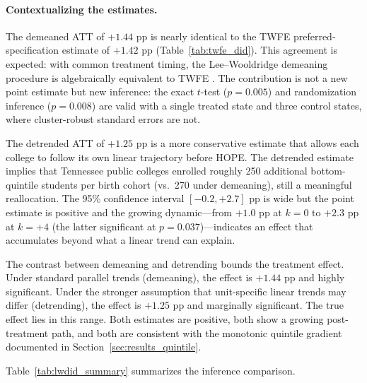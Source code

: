 \paragraph{Contextualizing the estimates.}

The demeaned ATT of $+1.44$ pp is nearly identical to the TWFE
preferred-specification estimate of $+1.42$ pp
(Table~\ref{tab:twfe_did}). This agreement is expected: with common
treatment timing, the Lee--Wooldridge demeaning procedure is
algebraically equivalent to TWFE
\parencite{lee2026simple}. The contribution is not a new point
estimate but new inference: the exact $t$-test ($p = 0.005$) and
randomization inference ($p = 0.008$) are valid with a single treated
state and three control states, where cluster-robust standard errors
are not.

The detrended ATT of $+1.25$ pp is a more conservative estimate that
allows each college to follow its own linear trajectory before HOPE.
The detrended estimate implies
that Tennessee public colleges enrolled roughly 250 additional
bottom-quintile students per birth cohort (vs.\ 270 under demeaning),
still a meaningful reallocation. The 95\% confidence interval
$[-0.2, +2.7]$ pp is wide but the point estimate is positive and
the growing dynamic---from $+1.0$ pp at $k = 0$ to $+2.3$ pp at
$k = +4$ (the latter significant at $p = 0.037$)---indicates an
effect that accumulates beyond what a linear trend can explain.

The contrast between demeaning and detrending bounds the treatment
effect. Under standard parallel trends (demeaning), the effect is
$+1.44$ pp and highly significant. Under the stronger assumption
that unit-specific linear trends may differ (detrending), the effect
is $+1.25$ pp and marginally significant. The true effect lies in
this range. Both estimates are positive, both show a growing
post-treatment path, and both are consistent with the monotonic
quintile gradient documented in Section~\ref{sec:results_quintile}.

Table~\ref{tab:lwdid_summary} summarizes the inference comparison.

